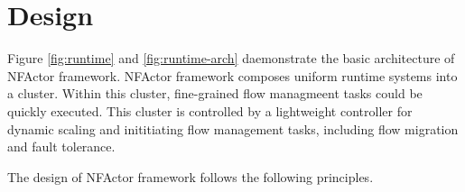 \section{Design}


Figure \ref{fig:runtime} and \ref{fig:runtime-arch} daemonstrate the basic architecture of NFActor framework. NFActor framework composes uniform runtime systems into a cluster. Within this cluster, fine-grained flow managmeent tasks could be quickly executed. This cluster is controlled by a lightweight controller for dynamic scaling and inititiating flow management tasks, including flow migration and fault tolerance.

The design of NFActor framework follows the following principles.

